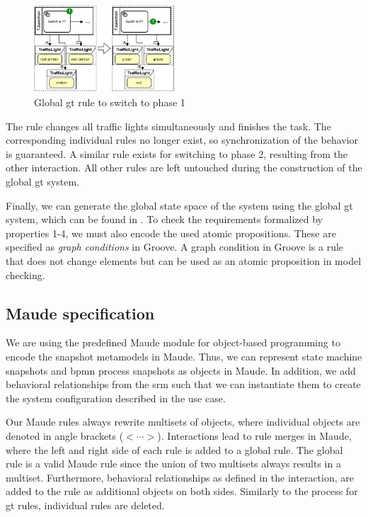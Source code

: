 \documentclass{jot}
\begin{document}
\begin{figure}[h]
    \centering
    \includegraphics[width=0.475\textwidth]{figures/global_rule.pdf}
    \caption{Global \gls*{gt} rule to switch to phase 1}
    \label{fig:global_rule}
\end{figure}

The rule changes all traffic lights simultaneously and finishes the task.
The corresponding individual rules no longer exist, so synchronization of the behavior is guaranteed.
A similar rule exists for switching to phase 2, resulting from the other interaction.
All other rules are left untouched during the construction of the global \gls*{gt} system.

Finally, we can generate the global state space of the system using the global \gls*{gt} system, which can be found in \cite{krauterArtifactsBehavioralConsistency2022}.
To check the requirements formalized by properties 1-4, we must also encode the used atomic propositions.
These are specified as \emph{graph conditions} in Groove.
A graph condition in Groove is a rule that does not change elements but can be used as an atomic proposition in model checking.


\subsection{Maude specification}
We are using the predefined Maude module for object-based programming to encode the snapshot metamodels in Maude.
Thus, we can represent state machine snapshots and \gls*{bpmn} process snapshots as objects in Maude.
In addition, we add behavioral relationships from the \gls*{srm} such that we can instantiate them to create the system configuration described in the use case.

Our Maude rules always rewrite multisets of objects, where individual objects are denoted in angle brackets ($<\cdots>$).
Interactions lead to rule merges in Maude, where the left and right side of each rule is added to a global rule.
The global rule is a valid Maude rule since the union of two multisets always results in a multiset. 
Furthermore, behavioral relationships as defined in the interaction, are added to the rule as additional objects on both sides.
Similarly to the process for \gls*{gt} rules, individual rules are deleted.
\end{document}
